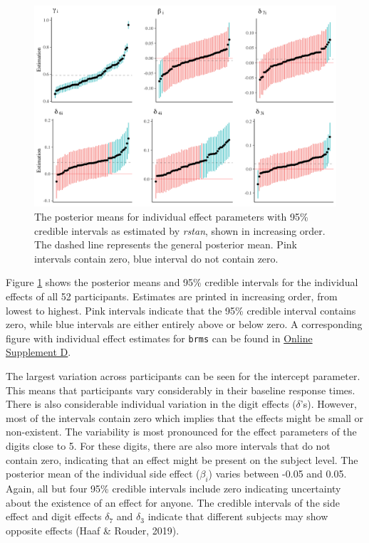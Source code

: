 \documentclass[
  english,
  doc,floatsintext]{apa6}
\begin{document}
\begin{figure}[H]

\includegraphics[width=1\linewidth]{Images/Fig10_randompar_v2} \hfill{}

\caption{The posterior means for individual effect parameters with 95\% credible intervals as estimated by \textit{rstan}, shown in increasing order. The dashed line represents the general posterior mean. Pink intervals contain zero, blue interval do not contain zero.}\label{fig:randomparfigure}
\end{figure}

Figure \ref{fig:randomparfigure} shows the posterior means and 95\% credible intervals for the individual effects of all 52 participants. Estimates are printed in increasing order, from lowest to highest. Pink intervals indicate that the 95\% credible interval contains zero, while blue intervals are either entirely above or below zero. A corresponding figure with individual effect estimates for \texttt{brms} can be found in \href{https://github.com/MyrtheV/Bayesian-Hierarchical-Modelling-An-Introduction-and-Reassessment/blob/main/D\%20-\%20Tutorial\%20Normal\%20Model\%20brms/Online-Supplement-D---Bayesian-Hierarchical-Modeling-in-brms.pdf}{Online Supplement D}.

The largest variation across participants can be seen for the intercept parameter. This means that participants vary considerably in their baseline response times. There is also considerable individual variation in the digit effects (\(\delta\)'s). However, most of the intervals contain zero which implies that the effects might be small or non-existent. The variability is most pronounced for the effect parameters of the digits close to 5. For these digits, there are also more intervals that do not contain zero, indicating that an effect might be present on the subject level. The posterior mean of the individual side effect (\(\beta_{i}\)) varies between -0.05 and 0.05. Again, all but four 95\% credible intervals include zero indicating uncertainty about the existence of an effect for anyone. The credible intervals of the side effect and digit effects \(\delta_{7}\) and \(\delta_{3}\) indicate that different subjects may show opposite effects (Haaf \& Rouder, 2019).
\end{document}

